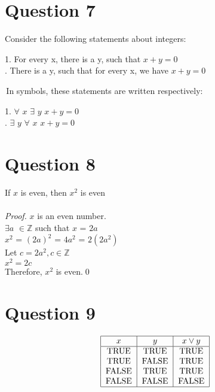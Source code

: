 \documentclass{article}
\newcommand{\Z}{\mathbb{Z}}
\begin{document}
    \section*{Question 7}
    Consider the following statements about integers: \\ \par
    1. For every x, there is a y, such that $x + y = 0$\smallskip\smallskip \\ 
    . There is a y, such that for every x, we have $x + y = 0$ \\ \par
    \,In symbols, these statements are written respectively: \\ \par
    1. $\forall$ $x$ $\exists$ $y$ $x + y = 0$ \smallskip\smallskip\\ 
    . $\exists$ $y$ $\forall$ $x$ $x + y = 0$ \\ 

    \section*{Question 8}
    
    If $x$ is even, then $x^2$ is even \\ \\
    \emph{Proof.} $x$ is an even number.\\
    $\exists a$ $\in\Z$ such that $x$ = $2a$ \\
    $x^2$ = $(2a)^2$ = $4a^2$ = $2(2a^2)$ \\
    Let $c = 2a^2, c\in\Z$ \\
    $x^2 = 2c$ \\
    Therefore, $x^2$ is even.\qed
    
     \section*{Question 9}
    \[\begin{tabular}{|c|c|c|}
    \hline
    $x$ & $y$ & $x\vee y$\\
    \hline
    TRUE & TRUE & TRUE \\
    TRUE & FALSE & TRUE \\
    FALSE & TRUE & TRUE \\
    FALSE & FALSE & FALSE\\
    \hline
    \end{tabular}\]
       
\end{document}
